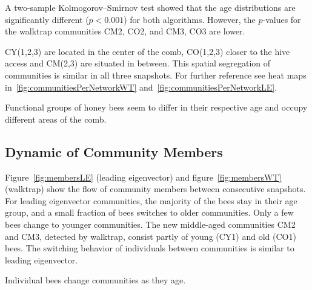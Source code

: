 A two-sample Kolmogorov–Smirnov test showed that the age distributions are significantly different ($p< 0.001$) for both algorithms. However, the $p$-values for the walktrap communities CM2, CO2, and CM3, CO3 are lower.

CY(1,2,3) are located in the center of the comb, CO(1,2,3) closer to the hive access and CM(2,3) are situated in between. This spatial segregation of communities is similar in all three snapshots. For further reference see heat maps in~\ref{fig:communitiesPerNetworkWT} and~\ref{fig:communitiesPerNetworkLE}.


Functional groups of honey bees seem to differ in their respective age and occupy different areas of the comb.






\subsection{Dynamic of Community Members}
Figure~\ref{fig:membersLE} (leading eigenvector) and figure~\ref{fig:membersWT} (walktrap) show the flow of  community members between consecutive snapshots.
For leading eigenvector communities, the majority of the bees stay in their age group, and a small fraction of bees switches to older communities.
Only a few bees change to younger communities.
The new middle-aged communities CM2 and CM3, detected by walktrap, consist partly of young (CY1) and old (CO1) bees. The switching behavior of individuals between communities is similar to leading eigenvector.

Individual bees change communities as they age.

